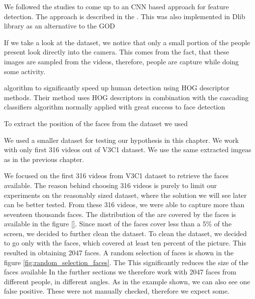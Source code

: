 We followed the studies to come up to an CNN based approach for feature detection. The approach is described in the \cite{}. This was also implemented in Dlib library as an alternative to the GOD



If we take a look at the dataset, we notice that only a small portion of the people present look directly into the camera. This comes from the fact, that these images are sampled from the videos, therefore, people are capture while doing some activity.

 algorithm to significantly speed up human detection using HOG descriptor methods. Their method uses HOG descriptors in combination with the cascading classifiers algorithm normally applied with great success to face detection


To extract the position of the faces from the dataset we used 

We used a smaller dataset for testing our hypothesis in this chapter. We work with only first 316 videos out of V3C1 dataset. We use the same extracted imgeas as in the previous chapter.




We focused on the first 316 videos from V3C1 dataset to retrieve the faces available. The reason behind choosing 316 videos is purely to limit our experiments on the reasonably sized dataset, where the solution we will see later can be better tested. From these 316 videos, we were able to capture more than seventeen thousands faces. The distribution of the are covered by the faces is available in the figure \ref{}. Since most of the faces cover less than a 5\% of the screen, we decided to further clean the dataset.  To clean the dataset, we decided to go only with the faces, which covered at least ten percent of the picture. This resulted in obtaining 2047 faces. A random selection of faces is shown in the figure \ref{fig:random_selection_faces}. The This significantly reduces the size of the faces available
In the further sections we therefore work with 2047 faces from different people, in different angles. As in the example shown, we can also see one false positive. These were not manually checked, therefore we expect some.

